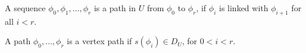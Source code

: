\begin{definition}[path] A sequence $\phi_0,\phi_1,\ldots,\phi_r$ is a path in $U$ from $\phi_0$ to $\phi_r$, if %
$\phi_i$ is linked with $\phi_{i+1}$ for all $i<r$.
\end{definition}

A path $\phi_0,\ldots,\phi_r$ is a vertex path if $s(\phi_i)\in D_U$,
for $0<i<r$.  

%

